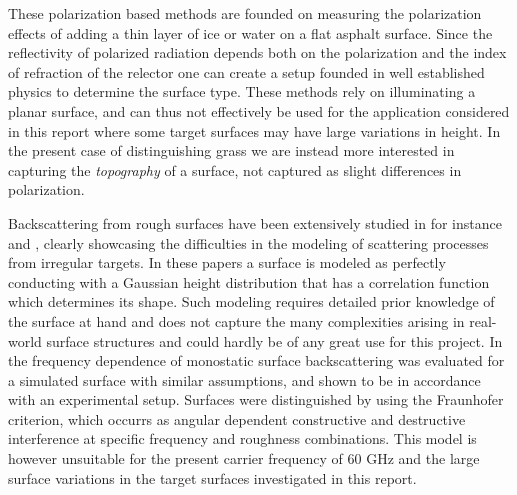 These polarization based methods are founded on measuring the polarization effects of adding a thin layer of ice or water on a flat asphalt surface. Since the reflectivity of polarized radiation depends both on the polarization and the index of refraction of the relector one can create a setup founded in well established physics to determine the surface type. These methods rely on illuminating a planar surface, and can thus not effectively be used for the application considered in this report where some target surfaces may have large variations in height. In the present case of distinguishing grass we are instead more interested in capturing the \emph{topography} of a surface, not captured as slight differences in polarization.

Backscattering from rough surfaces have been extensively studied in for instance \citep{fung_pan_1987} and \citep{fung_li_chen_1992}, clearly showcasing the difficulties in the modeling of scattering processes from irregular targets. In these papers a surface is modeled as perfectly conducting with a Gaussian height distribution that has a correlation function which determines its shape. Such modeling requires detailed prior knowledge of the surface at hand and does not capture the many complexities arising in real-world surface structures and could hardly be of any great use for this project. In \citep{scharf_iberle_mantz_walter_waldschrnidt_2018} the frequency dependence of monostatic surface backscattering was evaluated for a simulated surface with similar assumptions, and shown to be in accordance with an experimental setup. Surfaces were distinguished by using the Fraunhofer criterion, which occurrs as angular dependent constructive and destructive interference at specific frequency and roughness combinations. This model is however unsuitable for the present carrier frequency of 60 GHz and the large surface variations in the target surfaces investigated in this report.

